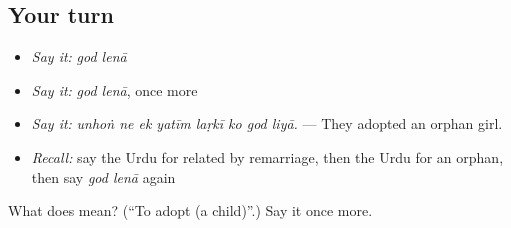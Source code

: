 \subsection*{Your turn}
\begin{itemize}
\raggedright
  \item \emph{Say it:} \emph{god lenā}
  \item \emph{Say it:} \emph{god lenā}, once more
  \item \emph{Say it:} \emph{unhoṅ ne ek yatīm laṛkī ko god liyā.} — They adopted an orphan girl.
  \item \emph{Recall:} say the Urdu for related by remarriage, then the Urdu for an orphan, then say \emph{god lenā} again
\end{itemize}

\begin{tcolorbox}[breakable,colback=teal!4,colframe=teal!35!black,title={Before you move on}]
What does   mean? (\textquotedblleft{}To adopt (a child)\textquotedblright{}.) Say it once more.
\end{tcolorbox}
